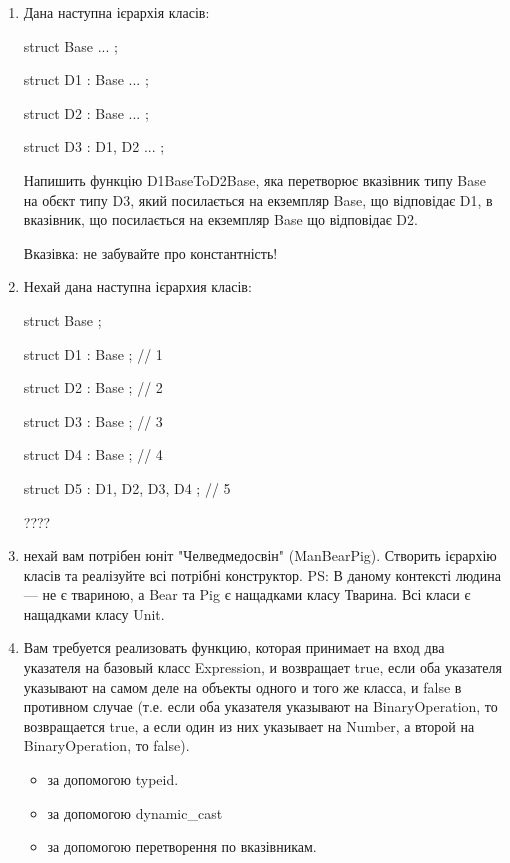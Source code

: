 \documentclass[]{article}
\begin{document}
\begin{enumerate}
\item
Дана наступна ієрархія класів:

struct Base { ... }; 

struct D1 : Base { ... };

struct D2 : Base { ... }; 

struct D3 : D1, D2 { ... };

Напишить функцію D1BaseToD2Base, яка перетворює вказівник типу Base на обєкт типу D3, 
який посилається на екземпляр Base, що відповідає D1, в вказівник, що посилається на екземпляр Base що відповідає D2.

Вказівка: не забувайте про константність!

\item

Нехай дана наступна ієрархия класів:

struct Base {};

struct D1 : Base {}; // 1

struct D2 : Base {}; // 2

struct D3 : Base {}; // 3

struct D4 : Base {}; // 4

struct D5 : D1, D2, D3, D4 {}; // 5

????


\item

нехай вам потрібен юніт "Челведмедосвін" (ManBearPig).
Створить ієрархію класів та реалізуйте всі потрібні конструктор.
PS: В даному контексті людина — не є твариною, а Bear та Pig є нащадками класу Тварина.
Всі класи є нащадками класу Unit.



\item
Вам требуется реализовать функцию, которая принимает на вход два указателя на базовый класс Expression, и возвращает true, если оба указателя указывают на самом деле на объекты одного и того же класса, и false в противном случае (т.е. если оба указателя указывают на BinaryOperation, то возвращается true, а если один из них указывает на Number, а второй на BinaryOperation, то false).

\begin{itemize}
\item
 за допомогою typeid.
\item
за допомогою dynamic\_cast 
\item
за допомогою перетворення по вказівникам.
\end{itemize}


\end{enumerate}
\end{document}
